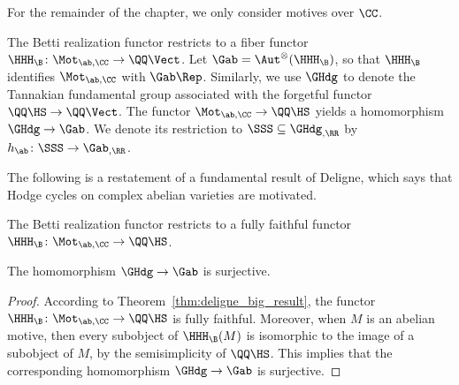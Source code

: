 For the remainder of the chapter, we only consider motives over $\CC$.

The Betti realization functor restricts to a fiber functor $\HHH_{\B}\colon \Mot_{\ab,\CC} \rightarrow \QQ\Vect$. Let $\Gab = \Aut^{\otimes}(\HHH_{\B})$, so that $\HHH_{\B}$ identifies $\Mot_{\ab,\CC}$ with $\Gab\Rep$. Similarly, we use $\GHdg$ to denote the Tannakian fundamental group associated with the forgetful functor $\QQ\HS \rightarrow \QQ\Vect$. The functor $\Mot_{\ab,\CC} \rightarrow \QQ\HS$ yields a homomorphism $\GHdg \rightarrow \Gab$. We denote its restriction to $\SSS \subseteq \GHdg_{,\RR}$ by $h_{\ab}\colon \SSS \rightarrow \Gab_{,\RR}$.

The following is a restatement of a fundamental result of Deligne, which says that Hodge cycles on complex abelian varieties are motivated.

\begin{theorem}\label{thm:deligne_big_result}
The Betti realization functor restricts to a fully faithful functor $\HHH_{\B}\colon \Mot_{\ab,\CC} \rightarrow \QQ\HS$.
\end{theorem}

\begin{corollary}\label{cor:gab_hodge_generic}
The homomorphism $\GHdg \rightarrow \Gab$ is surjective.
\end{corollary}
\begin{proof}
    According to Theorem~\ref{thm:deligne_big_result}, the functor $\HHH_{\B}\colon \Mot_{\ab,\CC} \rightarrow \QQ\HS$ is fully faithful. Moreover, when $M$ is an abelian motive, then every subobject of $\HHH_{\B}(M)$ is isomorphic to the image of a subobject of $M$, by the semisimplicity of $\QQ\HS$. This implies that the corresponding homomorphism $\GHdg \rightarrow \Gab$ is surjective.
\end{proof}

